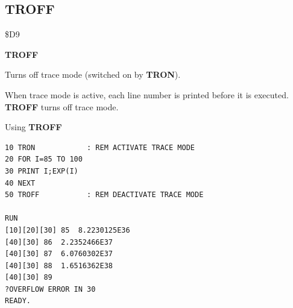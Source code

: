 \subsection{TROFF}
\begin{description}[leftmargin=2cm,style=nextline]
\item [Token:]    \$D9

\item [Format:]   {\bf TROFF}

\item [Usage:]    Turns off trace mode (switched on by {\bf TRON}).

                  When trace mode is active, each line number is printed before it is executed. {\bf TROFF} turns off trace mode.

\item [Example:]  Using {\bf TROFF}

\begin{tcolorbox}[colback=black,coltext=white]
\verbatimfont{\codefont}
\begin{verbatim}
10 TRON            : REM ACTIVATE TRACE MODE
20 FOR I=85 TO 100
30 PRINT I;EXP(I)
40 NEXT
50 TROFF           : REM DEACTIVATE TRACE MODE

RUN
[10][20][30] 85  8.2230125E36
[40][30] 86  2.2352466E37
[40][30] 87  6.0760302E37
[40][30] 88  1.6516362E38
[40][30] 89
?OVERFLOW ERROR IN 30
READY.
\end{verbatim}
\end{tcolorbox}
\end{description}


\newpage
